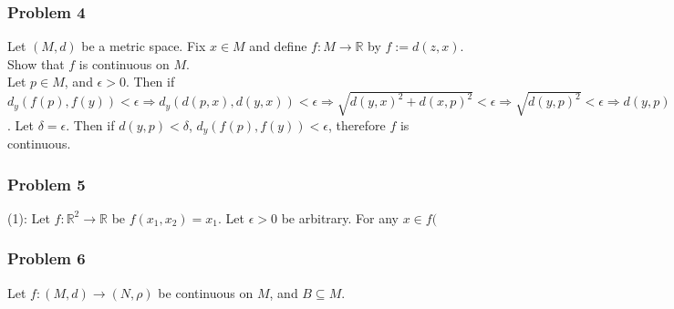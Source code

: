 \documentclass[10pt,a4paper]{article}
\newcommand{\R}{\mathbb{R}}
\begin{document}
\subsubsection{Problem 4}
Let $(M, d)$ be a metric space. Fix $x \in M$ and define $f: M \rightarrow \R$ by $f := d(z, x)$. Show that $f$ is continuous on $M$.\\

Let $p \in M$, and $\epsilon > 0$. Then if $d_y(f(p), f(y)) < \epsilon \Rightarrow d_y(d(p, x), d(y, x)) < \epsilon \Rightarrow \sqrt{d(y, x)^2 + d(x, p)^2} < \epsilon \Rightarrow \sqrt{d(y, p)^2} < \epsilon \Rightarrow d(y, p) < \epsilon$. Let $\delta = \epsilon$. Then if $d(y, p) < \delta$, $d_y(f(p), f(y)) < \epsilon$, therefore $f$ is continuous. 

\subsubsection{Problem 5}
(1): Let $f: \R^2 \rightarrow \R$ be $f(x_1, x_2) = x_1$. Let $\epsilon > 0$ be arbitrary. For any $x \in f($

\subsubsection{Problem 6}
Let $f: (M, d) \rightarrow (N, \rho)$ be continuous on $M$, and $B \subseteq M$.
\end{document}

